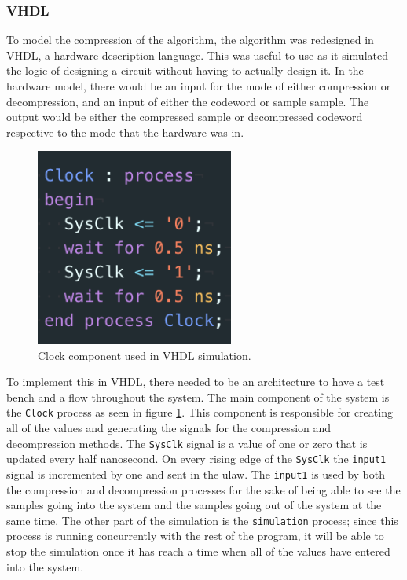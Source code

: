 \documentclass[12pt]{article}
\begin{document}
\subsubsection*{VHDL}

To model the compression of the algorithm, the algorithm was redesigned in VHDL, a hardware description language. This was useful to use as it simulated the logic of designing a circuit without having to actually design it. In the hardware model, there would be an input for the mode of either compression or decompression, and an input of either the codeword or sample sample. The output would be either the compressed sample or decompressed codeword respective to the mode that the hardware was in. \\

\begin{figure}[!h]
		\centering
        \includegraphics[width=6.5cm ]
        {clock_comp.png}
        \caption{\label{fig:clock_comp} Clock component used in VHDL simulation.}
\end{figure}


To implement this in VHDL, there needed to be an architecture to have a test bench and a flow throughout the system. The main component of the system is the \texttt{Clock} process as seen in figure \ref{fig:clock_comp}. This component is responsible for creating all of the values and generating the signals for the compression and decompression methods. The \texttt{SysClk} signal is a value of one or zero that is updated every half nanosecond. On every rising edge of the \texttt{SysClk} the \texttt{input1} signal is incremented by one and sent in the ulaw. The \texttt{input1} is used by both the compression and decompression processes for the sake of being able to see the samples going into the system and the samples going out of the system at the same time. The other part of the simulation is the \texttt{simulation} process; since this process is running concurrently with the rest of the program, it will be able to stop the simulation once it has reach a time when all of the values have entered into the system.\\
\end{document}
